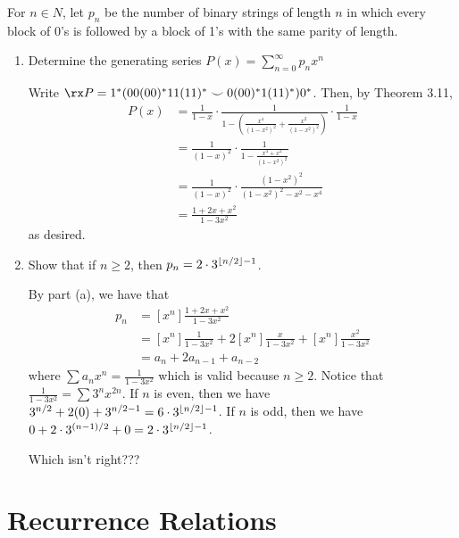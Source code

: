 \documentclass[class=math239,notes]{agony}
\begin{document}
\begin{xca}
  For $n \in N$, let $p_n$ be the number of binary strings of length $n$
  in which every block of 0's is followed by a block of 1's with the same parity of length.
\end{xca}
\begin{enumerate}
  \item Determine the generating series $P(x) = \sum_{n=0}^\infty p_n x^n$
        \begin{sol}
          Write $\rx P = 1^*(00(00)^*11(11)^* \smile 0(00)^*1(11)^*)0^*$.
          Then, by Theorem 3.11,
          \begin{align*}
            P(x)
             & = \frac{1}{1-x}\cdot\frac{1}{1-(\frac{x^4}{(1-x^2)^2} + \frac{x^2}{(1-x^2)^2})}\cdot\frac{1}{1-x} \\
             & = \frac{1}{(1-x)^2}\cdot\frac{1}{1-\frac{x^4+x^2}{(1-x^2)^2}}                                     \\
             & = \frac{1}{(1-x)^2}\cdot\frac{(1-x^2)^2}{(1-x^2)^2-x^2-x^4}                                       \\
             & = \frac{1+2x+x^2}{1-3x^2}
          \end{align*}
          as desired.
        \end{sol}
  \item Show that if $n \geq 2$, then $p_n = 2\cdot 3^{\lfloor n/2\rfloor-1}$.
        \begin{sol}
          By part (a), we have that
          \begin{align*}
            p_n
             & = [x^n] \frac{1+2x+x^2}{1-3x^2}                                              \\
             & = [x^n] \frac{1}{1-3x^2} + 2[x^n] \frac{x}{1-3x^2} + [x^n]\frac{x^2}{1-3x^2} \\
             & = a_n + 2a_{n-1} + a_{n-2}
          \end{align*}
          where $\sum a_n x^n = \frac{1}{1-3x^2}$ which is valid because $n \geq 2$.
          Notice that $\frac{1}{1-3x^2} = \sum 3^n x^{2n}$.
          If $n$ is even, then we have $3^{n/2}+ 2(0) + 3^{n/2-1} = 6\cdot 3^{\lfloor n/2\rfloor-1}$.
          If $n$ is odd, then we have $0 + 2\cdot 3^{(n-1)/2} + 0 = 2\cdot 3^{\lfloor n/2\rfloor-1}$.

          Which isn't right???
        \end{sol}
\end{enumerate}

\section{Recurrence Relations}
\end{document}
